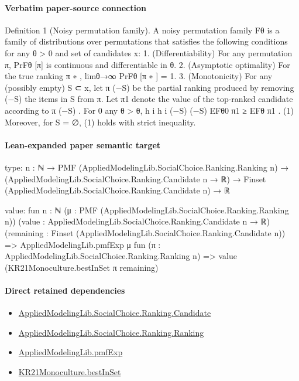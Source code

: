 \documentclass[10pt]{article}
\begin{document}
\paragraph{Verbatim paper-source connection}
\begin{ReviewVerbatim}
Definition 1 (Noisy permutation family). A noisy permutation family Fθ is a family of distributions over
permutations that satisfies the following conditions for any θ > 0 and set of candidates x:
1. (Differentiability) For any permutation π, PrFθ [π] is continuous and differentiable in θ.
2. (Asymptotic optimality) For the true ranking π ∗ , limθ→∞ PrFθ [π ∗ ] = 1.
3. (Monotonicity) For any (possibly empty) S ⊂ x, let π (−S) be the partial ranking produced by removing
(−S)
the items in S from π. Let π1
denote the value of the top-ranked candidate according to π (−S) . For
0
any θ > θ,
h
i
h
i
(−S)
(−S)
EFθ0 π1
≥ EFθ π1
.
(1)
Moreover, for S = ∅, (1) holds with strict inequality.
\end{ReviewVerbatim}



\paragraph{Lean-expanded paper semantic target}
\begin{ReviewVerbatim}
type:
{n : ℕ} →
  PMF (AppliedModelingLib.SocialChoice.Ranking.Ranking n) →
    (AppliedModelingLib.SocialChoice.Ranking.Candidate n → ℝ) →
      Finset (AppliedModelingLib.SocialChoice.Ranking.Candidate n) → ℝ

value:
fun {n : ℕ} (μ : PMF (AppliedModelingLib.SocialChoice.Ranking.Ranking n))
    (value : AppliedModelingLib.SocialChoice.Ranking.Candidate n → ℝ)
    (remaining : Finset (AppliedModelingLib.SocialChoice.Ranking.Candidate n)) =>
  AppliedModelingLib.pmfExp μ fun (π : AppliedModelingLib.SocialChoice.Ranking.Ranking n) =>
    value (KR21Monoculture.bestInSet π remaining)
\end{ReviewVerbatim}

\paragraph{Direct retained dependencies}
\begin{itemize}\raggedright
\item \hyperlink{library-prerequisite-8c0e6c25845ae78a}{Applied\allowbreak{}Modeling\allowbreak{}Lib.\allowbreak{}Social\allowbreak{}Choice.\allowbreak{}Ranking.\allowbreak{}Candidate}
\item \hyperlink{library-prerequisite-5cde54446d1ae021}{Applied\allowbreak{}Modeling\allowbreak{}Lib.\allowbreak{}Social\allowbreak{}Choice.\allowbreak{}Ranking.\allowbreak{}Ranking}
\item \hyperlink{governing-declaration-8e4b4389a4f6454b}{Applied\allowbreak{}Modeling\allowbreak{}Lib.\allowbreak{}pmf\allowbreak{}Exp}
\item \hyperlink{governing-declaration-f2dc4b58640ac1df}{KR21\allowbreak{}Monoculture.\allowbreak{}best\allowbreak{}In\allowbreak{}Set}
\end{itemize}
\end{document}
